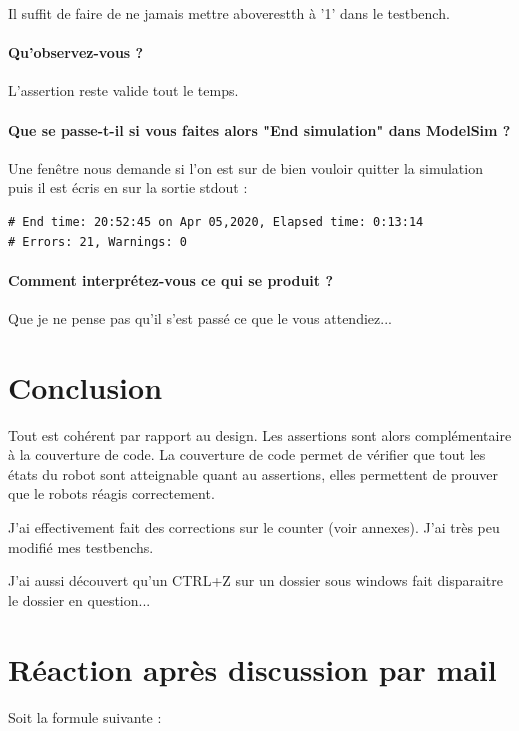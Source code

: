 \documentclass{article}
\newcommand{\sautligne}{
\textbf{\vspace{5mm}}
}
\begin{document}
Il suffit de faire de ne jamais mettre aboverestth à '1' dans le testbench.


\paragraph{Qu'observez-vous ?}

\sautligne

L'assertion reste valide tout le temps.

\paragraph{Que se passe-t-il
si vous faites alors "End simulation" dans ModelSim ?}

\sautligne

Une fenêtre nous demande si l'on est sur de bien vouloir quitter la simulation puis il est écris en sur la sortie stdout : 
\begin{verbatim}
# End time: 20:52:45 on Apr 05,2020, Elapsed time: 0:13:14
# Errors: 21, Warnings: 0
\end{verbatim}

\paragraph{ Comment interprétez-vous ce qui se
produit ?}


\sautligne

Que je ne pense pas qu'il s'est passé ce que le vous attendiez...

\newpage
\section{Conclusion}
Tout est cohérent par rapport au design. Les assertions sont alors complémentaire à la couverture de code. La couverture de code permet de vérifier que tout les états du robot sont atteignable quant au assertions, elles permettent de prouver que le robots réagis correctement.
\sautligne

J'ai effectivement fait des corrections sur le counter (voir annexes). J'ai très peu modifié mes testbenchs.
\sautligne

J'ai aussi découvert qu'un CTRL+Z sur un dossier sous windows fait disparaitre le dossier en question... 

\section{Réaction après discussion par mail}
\label{CTFO}
Soit la formule suivante  :
\vspace{2mm}
\end{document}
